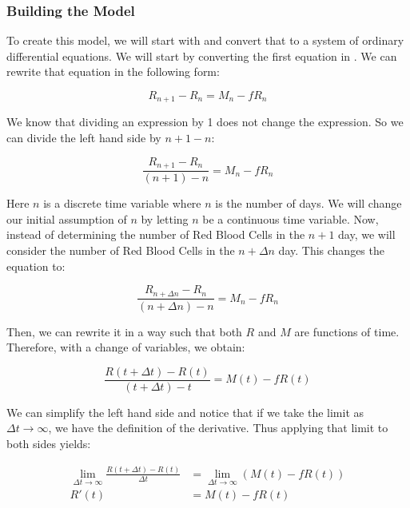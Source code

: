 \subsubsection{Building the Model}

To create this model, we will start with  and convert that to a system of ordinary differential equations. We will start by converting the first equation in . We can rewrite that equation in the following form:

\begin{equation*}
    R_{n+1} - R_n = M_n - fR_n
\end{equation*}

We know that dividing an expression by 1 does not change the expression. So we can divide the left hand side by $n+1-n$:

\begin{equation*}
    \frac{R_{n+1} - R_n}{(n+1)-n} = M_n - fR_n
\end{equation*}

Here $n$ is a discrete time variable where $n$ is the number of days. We will change our initial assumption of $n$ by letting $n$ be a continuous time variable. Now, instead of determining the number of Red Blood Cells in the $n+1$ day, we will consider the number of Red Blood Cells in the $n+\Delta n$ day. This changes the equation to:

\begin{equation*}
    \frac{R_{n+\Delta n} - R_n}{(n+\Delta n)-n} = M_n - fR_n
\end{equation*}

Then, we can rewrite it in a way such that both $R$ and $M$ are functions of time. Therefore, with a change of variables, we obtain:

\begin{equation*}
    \frac{R(t+\Delta t) - R(t)}{(t+\Delta t)-t} = M(t) - fR(t)
\end{equation*}

We can simplify the left hand side and notice that if we take the limit as $\Delta t\to\infty$, we have the definition of the derivative. Thus applying that limit to both sides yields:

\begin{align}
    \lim_{\Delta t\to\infty} \frac{R(t+\Delta t) - R(t)}{\Delta t} &= \lim_{\Delta t\to\infty} (M(t) - fR(t)) \nonumber\\
    R'(t) &= M(t) - fR(t) \label{eq:linear-differential-equation-R}
\end{align}

